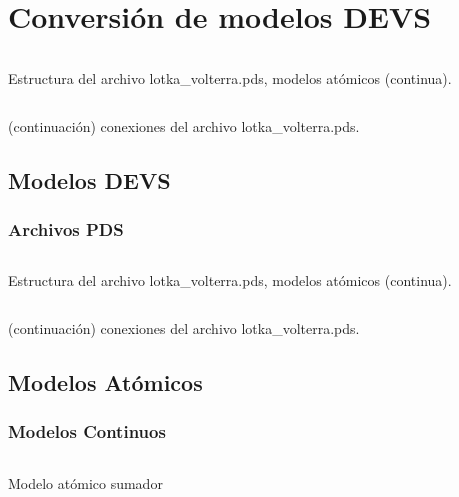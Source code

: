 \documentclass{beamer}
\begin{document}
\chapter{Conversión de modelos DEVS}
\begin{frame}
\begin{listing}[H]
        \inputminted[linenos,breaklines=true,lastline=32]{modelica}{src/lotka_volterra.pds}
\caption{Estructura del archivo lotka\_volterra.pds, modelos atómicos (continua).}\label{lst:pdsstruc}
\end{listing}
\end{frame}

\begin{frame}
\begin{listing}[H]
        \inputminted[firstline=33,linenos,breaklines=true]{modelica}{src/lotka_volterra.pds}
\caption{(continuación) conexiones del archivo lotka\_volterra.pds.}\label{lst:pdsstruc-cont}
\end{listing}
\end{frame}

\section{Modelos DEVS}
\subsection{Archivos PDS}
\begin{frame}
\begin{listing}[H]
        \inputminted[linenos,breaklines=true,lastline=32]{modelica}{src/lotka_volterra.pds}
\caption{Estructura del archivo lotka\_volterra.pds, modelos atómicos (continua).}\label{lst:pdsstruc}
\end{listing}
\end{frame}

\begin{frame}
\begin{listing}[H]
        \inputminted[firstline=33,linenos,breaklines=true]{modelica}{src/lotka_volterra.pds}
\caption{(continuación) conexiones del archivo lotka\_volterra.pds.}\label{lst:pdsstruc-cont}
\end{listing}
\end{frame}

\section{Modelos Atómicos}
\subsection{Modelos Continuos}
\begin{frame}
\begin{listing}[H]
        \inputminted[]{modelica}{../../data/qss/qss_wsum.mo}
        \caption{Modelo atómico sumador}\label{lst:qss_wsum.mo}
\end{listing}
\end{frame}
\end{document}
